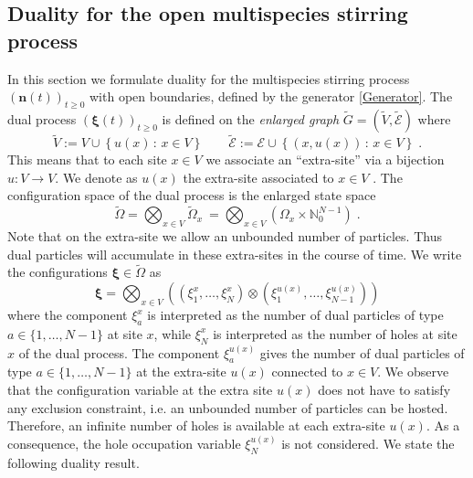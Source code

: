 \documentclass[10pt]{article}
\numberwithin{equation}{section}
\numberwithin{equation}{subsection}
\newcommand{\dt}{\;.}
\begin{document}
\subsection{Duality for the open multispecies stirring process}\label{statementDualitySubsection}
In this section we formulate duality for the multispecies stirring process $(\bm{n}(t))_{t\geq 0}$ with open boundaries, defined by the generator \eqref{Generator}.
The dual  process $(\bm{\xi}(t))_{t\geq 0}$ is defined on the \textit{enlarged graph} $\widetilde{G}=(\widetilde{V},\widetilde{\mathcal{E}})$ where 
\begin{equation}
	\widetilde{V}:=V\cup \left\{u(x)\,:\, x\in V\right\}\qquad \widetilde{\mathcal{E}}:=\mathcal{E}\cup \left\{(x,u(x))\,:\, x\in V\right\}\dt
\end{equation}
This means that to each site $x\in V$ we associate an ``extra-site'' via a bijection $u:V\to V$. We denote as $u(x)$ the extra-site associated to $x\in V$ . The configuration space of the dual process is the enlarged state space
\begin{equation}\label{dualStateSpace}
    \widetilde{\Omega}= \bigotimes_{x\in V} \widetilde{\Omega}_{x}\ = \bigotimes_{x\in V} (\Omega_{x}\times \mathbb{N}_{0}^{N-1})\dt
\end{equation}
Note that on the extra-site we allow an unbounded number of particles. Thus
dual particles will accumulate in these extra-sites in the course of time. 
We write the configurations $\bm{\xi} \in \widetilde\Omega$  as
\begin{equation}\label{row-dual-vectors}
    \bm{\xi}=\bigotimes_{x\in V} \left(\left(\xi_{1}^{x},\ldots,\xi_{N}^{x}\right)\otimes (\xi_{1}^{u(x)},\ldots,\xi_{N-1}^{u(x)} )\right) 
\end{equation} 
where the component $\xi_{a}^{x}$ is interpreted as the number of dual particles of type $a\in \{1,\ldots,N-1\}$ at site $x$, {while $\xi_{N}^{x}$ is interpreted as the number of holes at site $x$ of the dual process.}
The component $\xi_{a}^{u(x)}$  gives the number of dual particles of type $a\in \{1,\ldots,N-1\}$ at 
the extra-site $u(x)$ connected to $x\in V$. {We observe that the configuration variable at the extra site $u(x)$ does not have to satisfy any exclusion constraint, i.e. an unbounded number of particles can be hosted. Therefore, an infinite number of holes is available at each extra-site $u(x)$. As a consequence, the hole occupation variable $\xi_{N}^{u(x)}$ is not considered}. We state the following duality result.
\end{document}
